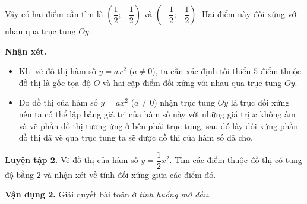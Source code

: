\begin{lesson}
    Vậy có hai điểm cần tìm là $\left(\dfrac{1}{2};-\dfrac{1}{2}\right)$ và $\left(-\dfrac{1}{2};-\dfrac{1}{2}\right)$. Hai điểm này đối xứng với nhau qua trục tung $Oy$.

    \textbf{Nhận xét.}
    \begin{itemize}
        \item Khi vẽ đồ thị hàm số $y=ax^2$ ($a\ne0$), ta cần xác định tối thiểu $5$ điểm thuộc đồ thị là gốc tọa độ $O$ và hai cặp điểm đối xứng với nhau qua trục tung $Oy$.
        \item Do đồ thị của hàm số $y=ax^2$ ($a\ne0$) nhận trục tung $Oy$ là trục đối xứng nên ta có thể lập bảng giá trị của hàm số này với những giá trị $x$ không âm và vẽ phần đồ thị tương ứng ở bên phải trục tung, sau đó lấy đối xứng phần đồ thị đã vẽ qua trục tung ta sẽ được đồ thị của hàm số đã cho.
    \end{itemize}

    \textbf{Luyện tập 2.} Vẽ đồ thị của hàm số $y=\dfrac{1}{2}x^2$. Tìm các điểm thuộc đồ thị có tung độ bằng $2$ và nhận xét về tính đối xứng giữa các điểm đó.

    \answerline
    \answerline
    \answerline

    \textbf{Vận dụng 2.} Giải quyết bài toán ở \textit{tình huống mở đầu}.

    \answerline
    \answerline
\end{lesson}

